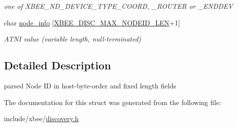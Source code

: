 \begin{DoxyCompactItemize}
\begin{DoxyCompactList}\small\item\em one of X\-B\-E\-E\-\_\-\-N\-D\-\_\-\-D\-E\-V\-I\-C\-E\-\_\-\-T\-Y\-P\-E\-\_\-\-C\-O\-O\-R\-D, \-\_\-\-R\-O\-U\-T\-E\-R or \-\_\-\-E\-N\-D\-D\-E\-V \end{DoxyCompactList}\item 
\hypertarget{group__xbee__discovery_gaa667bab3abb953bc14d9f5bcc36644b8}{char \hyperlink{group__xbee__discovery_gaa667bab3abb953bc14d9f5bcc36644b8}{node\-\_\-info} \mbox{[}\hyperlink{group__xbee__discovery_ga0df6e63d6ccca22fcf154b6f0be46da6}{X\-B\-E\-E\-\_\-\-D\-I\-S\-C\-\_\-\-M\-A\-X\-\_\-\-N\-O\-D\-E\-I\-D\-\_\-\-L\-E\-N}+1\mbox{]}}\label{group__xbee__discovery_gaa667bab3abb953bc14d9f5bcc36644b8}

\begin{DoxyCompactList}\small\item\em A\-T\-N\-I value (variable length, null-\/terminated) \end{DoxyCompactList}\end{DoxyCompactItemize}


\subsection{Detailed Description}
parsed Node I\-D in host-\/byte-\/order and fixed length fields 

The documentation for this struct was generated from the following file\-:\begin{DoxyCompactItemize}
\item 
include/xbee/\hyperlink{discovery_8h}{discovery.\-h}\end{DoxyCompactItemize}
